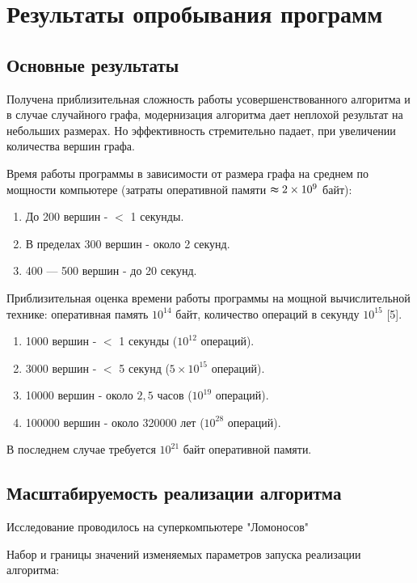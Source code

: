 \section{Результаты опробывания программ}
\label{sec:Results_8} 
\large 

\subsection{Основные результаты}
Получена приблизительная сложность работы усовершенствованного алгоритма и в случае случайного графа, модернизация алгоритма дает неплохой результат на небольших размерах. Но эффективность стремительно падает, при увеличении количества вершин графа.

Время работы программы в зависимости от размера графа на среднем по мощности компьютере (затраты оперативной памяти $\thickapprox 2\times 10^9$ байт):
\begin{enumerate}
\item  До 200 вершин - $<$ 1 секунды.
\item  В пределах 300 вершин - около 2 секунд.
\item  400 — 500 вершин - до 20 секунд.
\end{enumerate}




Приблизительная оценка времени работы программы на мощной вычислительной технике:
оперативная память $10^{14}$ байт,
количество операций в секунду $10^{15}$ [5].
\begin{enumerate}
\item 1000 вершин - $<$ 1 секунды  ($10^{12}$  операций).
\item 3000 вершин - $<$ 5 секунд ($5\times 10^{15}$ операций).
\item 10000 вершин - около $2,5$ часов ($10^{19}$ операций).
\item 100000 вершин - около 320000 лет ($10 ^{28}$ операций).
\end{enumerate}
В последнем случае требуется $10^{21}$ байт оперативной памяти.


\subsection{Масштабируемость реализации алгоритма}
Исследование проводилось на суперкомпьютере "Ломоносов" \cite{Voevodin_article_1}

Набор и границы значений изменяемых параметров запуска реализации алгоритма: 

